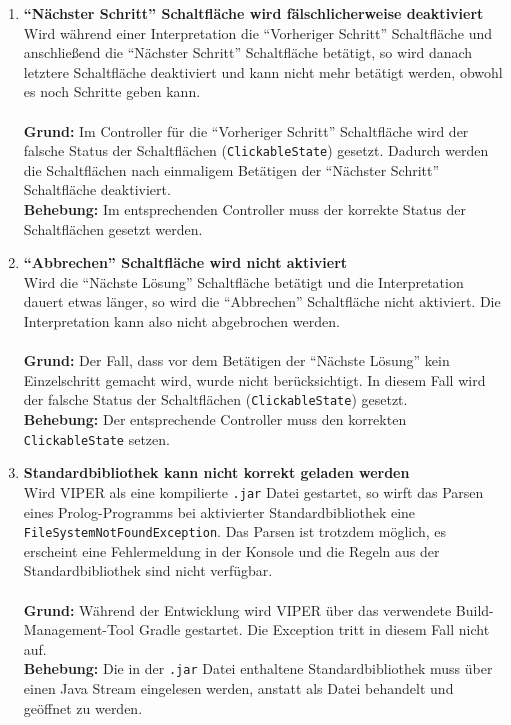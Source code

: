 \documentclass[parskip=full,11pt,twoside]{scrartcl}
\begin{document}
\begin{enumerate}[label=\#\arabic*]
  \item \textbf{\enquote{Nächster Schritt} Schaltfläche wird fälschlicherweise deaktiviert}\\
        Wird während einer Interpretation die \enquote{Vorheriger Schritt} Schaltfläche und anschließend die \enquote{Nächster Schritt} Schaltfläche betätigt, so wird danach letztere Schaltfläche deaktiviert und kann nicht mehr betätigt werden, obwohl es noch Schritte geben kann.\\\\
        \textbf{Grund:} Im Controller für die \enquote{Vorheriger Schritt} Schaltfläche wird der falsche Status der Schaltflächen (\texttt{ClickableState}) gesetzt. Dadurch werden die Schaltflächen nach einmaligem Betätigen der \enquote{Nächster Schritt} Schaltfläche deaktiviert.\\
        \textbf{Behebung:} Im entsprechenden Controller muss der korrekte Status der Schaltflächen gesetzt werden.

  \item \textbf{\enquote{Abbrechen} Schaltfläche wird nicht aktiviert}\\
        Wird die \enquote{Nächste Lösung} Schaltfläche betätigt und die Interpretation dauert etwas länger, so wird die \enquote{Abbrechen} Schaltfläche nicht aktiviert. Die Interpretation kann also nicht abgebrochen werden.\\\\
        \textbf{Grund:} Der Fall, dass vor dem Betätigen der \enquote{Nächste Lösung} kein Einzelschritt gemacht wird, wurde nicht berücksichtigt. In diesem Fall wird der falsche Status der Schaltflächen (\texttt{ClickableState}) gesetzt.\\
        \textbf{Behebung:} Der entsprechende Controller muss den korrekten \texttt{ClickableState} setzen.

  \item \textbf{Standardbibliothek kann nicht korrekt geladen werden}\\
        Wird VIPER als eine kompilierte \texttt{.jar} Datei gestartet, so wirft das Parsen eines Prolog-Programms bei aktivierter Standardbibliothek eine \texttt{FileSystemNotFoundException}. Das Parsen ist trotzdem möglich, es erscheint eine Fehlermeldung in der Konsole und die Regeln aus der Standardbibliothek sind nicht verfügbar.\\\\
        \textbf{Grund:} Während der Entwicklung wird VIPER über das verwendete Build-Management-Tool Gradle gestartet. Die Exception tritt in diesem Fall nicht auf.\\
        \textbf{Behebung:} Die in der \texttt{.jar} Datei enthaltene Standardbibliothek muss über einen Java Stream eingelesen werden, anstatt als Datei behandelt und geöffnet zu werden.


\end{enumerate}
\end{document}
